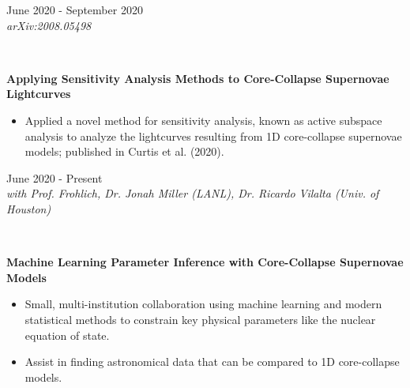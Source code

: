 \documentclass[7.5pt]{article}
\def \tertiarycolor  {airforceblue} %
\def \leftcolwidth{3.10cm}
\newcommand{\cventry}[4]{
    \begin{minipage}[t]{\leftcolwidth} 
        \small{
            \begin{flushright}
                #2\\
                \textcolor{\tertiarycolor}{\textit{#4}}
            \end{flushright}
        }
    \end{minipage} \ \
    \begin{minipage}[t]{\linewidth-\leftcolwidth} \normalsize{\textbf{#1} \\ #3} \end{minipage}
} %
\begin{document}

\cventry{Applying Sensitivity Analysis Methods to Core-Collapse Supernovae Lightcurves}{June 2020 - September 2020}{\vspace*{-3.5mm} \begin{itemize}
    \item Applied a novel method for sensitivity analysis, known as active subspace analysis to analyze the lightcurves resulting from 1D core-collapse supernovae models; published in Curtis et al. (2020).
\end{itemize}}{arXiv:2008.05498}

\cventry{Machine Learning Parameter Inference with Core-Collapse Supernovae Models}{June 2020 - Present}{\vspace*{-3.5mm} \begin{itemize}
    \item Small, multi-institution collaboration using machine learning and modern statistical methods to constrain key physical parameters like the nuclear equation of state.
    \item Assist in finding astronomical data that can be compared to 1D core-collapse models.
\end{itemize}}{with Prof. Frohlich, Dr. Jonah Miller (LANL), Dr. Ricardo Vilalta (Univ. of Houston)}

\end{document}

